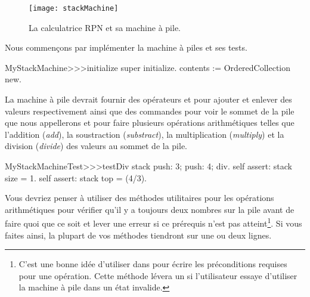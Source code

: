 \documentclass[a4paper,10pt,twoside]{book}
\begin{document}
\begin{figure}[ht]
\begin{center}
\texttt{[image: stackMachine]}
\caption{La calculatrice RPN et sa machine à pile.}
\end{center}
\end{figure}

Nous commençons par implémenter la machine à piles et ses tests.


\begin{code}{}
MyStackMachine>>>initialize
	super initialize.
	contents := OrderedCollection new.
\end{code}

La machine à pile devrait fournir des opérateurs  et
pour ajouter et enlever des valeurs respectivement ainsi que des
commandes pour voir le sommet de la pile que nous appellerons  
et pour faire plusieurs opérations arithmétiques telles que l'addition (\emph{add}),
la soustraction (\emph{substract}), la multiplication (\emph{multiply}) 
et la division (\emph{divide}) des valeurs au sommet de la pile.


\begin{code}{}
MyStackMachineTest>>>testDiv
	stack
		push: 3;
		push: 4;
		div.
	self assert: stack size = 1.
	self assert: stack top = (4/3).
\end{code}

Vous devriez penser à utiliser des méthodes utilitaires pour les
opérations arithmétiques pour vérifier qu'il y a toujours deux nombres
sur la pile avant de faire quoi que ce soit et lever une erreur si
ce prérequis n'est pas atteint\footnote{C'est une bonne idée d'utiliser  
dans 
pour écrire les préconditions requises pour une opération. Cette méthode lévera un 
 si l'utilisateur essaye d'utiliser la machine à pile dans un état invalide.}.
Si vous faites ainsi, la plupart de vos méthodes tiendront sur une ou deux lignes.
\end{document}
